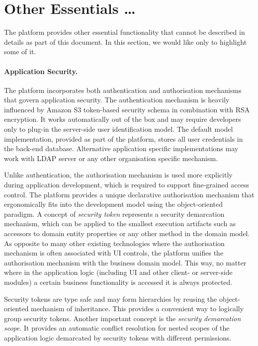 \section{Other Essentials \ldots}\label{sec:07}

  The platform provides other essential functionality that cannot be described in details as part of this document.
  In this section, we would like only to highlight some of it.

  \paragraph{Application Security.}
  The platform incorporates both authentication and authorisation mechanisms that govern application security.
  The authentication mechanism is heavily influenced by Amazon S3 token-based security schema in combination with RSA encryption.
  It works automatically out of the box and may require developers only to plug-in the server-side user identification model.
  The default model implementation, provided as part of the platform, stores all user credentials in the back-end database.
  Alternative application specific implementations may work with LDAP server or any other organisation specific mechanism.
  
  Unlike authentication, the authorisation mechanism is used more explicitly during application development, which is required to support fine-grained access control.
  The platform provides a unique declarative authorisation mechanism that ergonomically fits into the development model using the object-oriented paradigm.
  A concept of \emph{security token} represents a security demarcation mechanism, which can be applied to the smallest execution artifacts such as accessors to domain entity properties or any other method in the domain model.
  As opposite to many other existing technologies where the authorisation mechanism is often associated with UI controls, the platform unifies the authorisation mechanism with the business domain model.
  This way, no matter where in the application logic (including UI and other client- or server-side modules) a certain business functionality is accessed it is always protected.
  
  Security tokens are type safe and may form hierarchies by reusing the object-oriented mechanism of inheritance.
  This provides a convenient way to logically group security tokens.
  Another important concept is the \emph{security demarcation scope}.
  It provides an automatic conflict resolution for nested scopes of the application logic demarcated by security tokens with different permissions.
 

